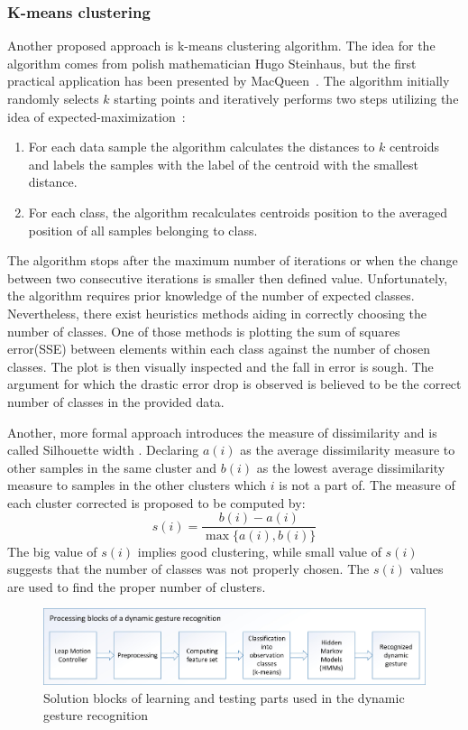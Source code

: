 \subsubsection{K-means clustering}
Another proposed approach is k-means clustering algorithm.
The idea for the algorithm comes from polish mathematician Hugo Steinhaus, but the first practical application has been presented by MacQueen~\cite{kmeans2}.
The algorithm initially randomly selects $k$ starting points and iteratively performs two steps utilizing the idea of expected-maximization~\cite{expectedmaximization}:
\begin{enumerate}
\item For each data sample the algorithm calculates the distances to $k$ centroids and labels the samples with the label of the centroid with the smallest distance.
\item For each class, the algorithm recalculates centroids position to the averaged position of all samples belonging to class.
\end{enumerate} 
The algorithm stops after the maximum number of iterations or when the change between two consecutive iterations is smaller then defined value.
Unfortunately, the algorithm requires prior knowledge of the number of expected classes.
Nevertheless, there exist heuristics methods aiding in correctly choosing the number of classes. 
One of those methods is plotting the sum of squares error(SSE) between elements within each class against the number of chosen classes. 
The plot is then visually inspected and the fall in error is sough.
The argument for which the drastic error drop is observed is believed to be the correct number of classes in the provided data.

Another, more formal approach introduces the measure of dissimilarity and is called Silhouette width \cite{silhouette}.
Declaring $a(i)$ as the average dissimilarity measure to other samples in the same cluster and $b(i)$ as the lowest average dissimilarity measure to samples in the other clusters which $i$ is not a part of.
The measure of each cluster corrected is proposed to be computed by:
\begin{equation}
s(i) = \frac{b(i) - a(i)}{\max{\{a(i),b(i)}\}}
\end{equation}
The big value of $s(i)$ implies good clustering, while small value of $s(i)$ suggests that the number of classes was not properly chosen.
The $s(i)$ values are used to find the proper number of clusters.


\begin{figure}[htb]
\centering
 \includegraphics[width=1\columnwidth]{figures/DynamicGestures2.jpg}
 \caption{Solution blocks of learning and testing parts used in the dynamic gesture recognition}
 \label{dynamicgesturesflow}
\end{figure}

